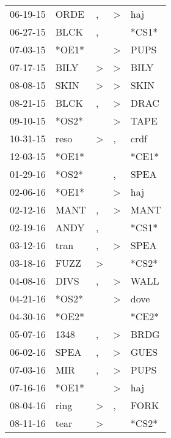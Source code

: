 \begin{supertabular}{lllll}
 06-19-15 &   ORDE &                , &     \textgreater &    haj \\
 06-27-15 &   BLCK &                , &                  &  *CS1* \\
 07-03-15 &  *OE1* &                  &     \textgreater &   PUPS \\
 07-17-15 &   BILY &     \textgreater &     \textgreater &   BILY \\
 08-08-15 &   SKIN &     \textgreater &     \textgreater &   SKIN \\
 08-21-15 &   BLCK &                , &     \textgreater &   DRAC \\
 09-10-15 &  *OS2* &                  &     \textgreater &   TAPE \\
 10-31-15 &   reso &     \textgreater &                , &   crdf \\
 12-03-15 &  *OE1* &                  &                  &  *CE1* \\
 01-29-16 &  *OS2* &                  &                , &   SPEA \\
 02-06-16 &  *OE1* &                  &     \textgreater &    haj \\
 02-12-16 &   MANT &                , &     \textgreater &   MANT \\
 02-19-16 &   ANDY &                , &                  &  *CS1* \\
 03-12-16 &   tran &                , &     \textgreater &   SPEA \\
 03-18-16 &   FUZZ &     \textgreater &                  &  *CS2* \\
 04-08-16 &   DIVS &                , &     \textgreater &   WALL \\
 04-21-16 &  *OS2* &                  &     \textgreater &   dove \\
 04-30-16 &  *OE2* &                  &                  &  *CE2* \\
 05-07-16 &   1348 &                , &     \textgreater &   BRDG \\
 06-02-16 &   SPEA &                , &     \textgreater &   GUES \\
 07-03-16 &    MIR &                , &     \textgreater &   PUPS \\
 07-16-16 &  *OE1* &                  &     \textgreater &    haj \\
 08-04-16 &   ring &     \textgreater &                , &   FORK \\
 08-11-16 &   tear &     \textgreater &                  &  *CS2* \\

\end{supertabular}
